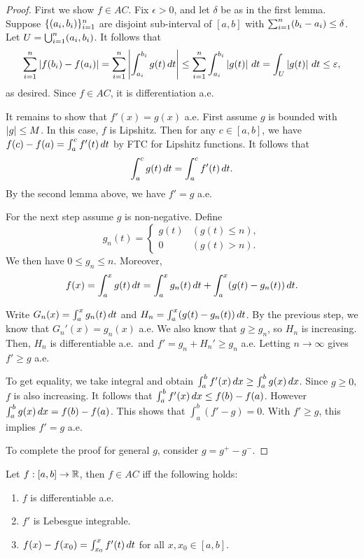 \documentclass[a4paper]{article}
\begin{document}
\begin{proof}
  First we show $f \in AC$. Fix $\epsilon > 0$, and let $\delta$ be as in
  the first lemma. Suppose $\{ (a_i, b_i) \}_{i=1}^n$ are disjoint sub-interval
  of $[a, b]$ with $\sum_{i=1}^n (b_i - a_i) \leq \delta$. Let $U = \bigcup_{i=1}^n
    (a_i, b_i)$. It follows that
  \begin{align*}
    \sum_{i=1}^n \left\lvert f(b_i) - f(a_i)\right\rvert
    = \sum_{i=1}^n \left\lvert \int_{a_i}^{b_i} g(t) \, d t\right\rvert
    \leq \sum_{i=1}^n \int_{a_i}^{b_i} \left\lvert g(t)\right\rvert \, d t
    = \int_U \left\lvert g(t)\right\rvert \, d t
    \leq \varepsilon,
  \end{align*}
  as desired. Since $f \in AC$, it is differentiation a.e.

  It remains to show that $f'(x) = g(x)$ a.e. First assume $g$ is bounded
  with $\left\lvert g\right\rvert \leq M$. In this case, $f$ is Lipshitz. Then for any $c
  \in [a, b]$, we have $f(c) - f(a) = \int_a^c f'(t) \, d t$ by FTC for
  Lipshitz functions. It follows that
  \[
    \int_a^c g(t) \, d t = \int_a^c f'(t) \, d t.
  \]
  By the second lemma above, we have $f' = g$ a.e.

  For the next step assume $g$ is non-negative. Define
  \[
    g_n(t) = \begin{cases}
      g(t) & (g(t) \leq n), \\
      0    & (g(t) > n).
    \end{cases}
  \]
  We then have $0 \leq g_n \leq n$. Moreover,
  \begin{align*}
    f(x)
    = \int_a^x g(t) \, d t
    = \int_a^x g_n(t) \, d t + \int_a^x (g(t) - g_n(t)) \, d t.
  \end{align*}

  Write $G_n(x) = \int_a^x g_n(t) \, d t$ and $H_n = \int_a^x (g(t) -
  g_n(t)) \, d t$. By the previous step, we know that $G_n' (x) = g_n(x)$
  a.e. We also know that $g \geq g_n$, so $H_n$ is increasing. Then, $H_n$
  is differentiable a.e.\ and $f' = g_n + H_n' \geq g_n$ a.e. Letting $n
  \to \infty$ gives $f' \geq g$ a.e.

  To get equality, we take integral and obtain $\int_a^b f'(x) \, d x \geq
  \int_a^b g(x) \, d x$. Since $g \geq 0$, $f$ is also increasing. It
  follows that $\int_a^b f'(x) \, d x \leq f(b) - f(a)$. However $\int_a^b
  g(x) \, d x = f(b) - f(a)$. This shows that $\int_a^b (f' - g) = 0$. With
  $f' \geq g$, this implies $f' = g$ a.e.

  To complete the proof for general $g$, consider $g = g^+ - g^-$.
\end{proof}

\begin{thm}[FTC 2]
  Let $f : [a, b] \to \mathbb{R}$, then $f \in AC$ iff the following holds:
  \begin{enumerate}
    \item $f$ is differentiable a.e.
    \item $f'$ is Lebesgue integrable.
    \item $f(x) - f(x_0) = \int_{x_0}^x f'(t) \, d t$ for all
          $x, x_0 \in [a, b]$.
  \end{enumerate}
\end{thm}
\end{document}
